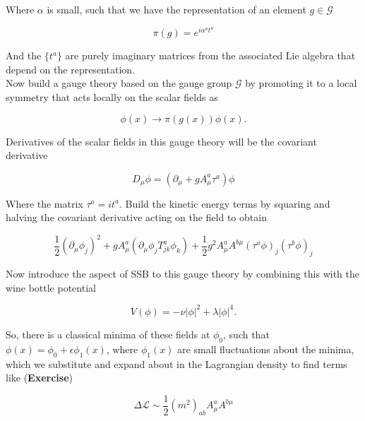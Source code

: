  \noindent Where $\alpha$ is small, such that we have the representation of an element $g \in \mathcal{G}$
 
 \begin{equation}
 \pi (g) = e^{i \alpha^a t^a}
 \end{equation}
 
 \noindent And the $\{t^a\}$ are purely imaginary matrices from the associated Lie algebra that depend on the representation. \\
 
 \noindent Now build a gauge theory based on the gauge group $\mathcal{G}$ by promoting it to a local symmetry that acts locally on the scalar fields as
 
 \begin{equation}
 \phi (x) \rightarrow \pi (g(x)) \phi (x).
 \end{equation}
 
 \noindent Derivatives of the scalar fields in this gauge theory will be the covariant derivative
 
 \begin{equation}
 D_\mu \phi = (\partial_\mu + g A_\mu^a \tau^a ) \phi
 \end{equation}
 
 \noindent Where the matrix $\tau^a = i t^a$. Build the kinetic energy terms by squaring and halving the covariant derivative acting on the field to obtain
 
 \begin{equation}
 \frac{1}{2} (\partial_\mu \phi_j )^2 + g A_\mu^a ( \partial_\mu \phi_j T_{jk}^a \phi_k ) + \frac{1}{2} g^2 A_\mu^a A^{b \mu} (\tau^a \phi)_j (\tau^b \phi)_j
 \end{equation}

\noindent Now introduce the aspect of SSB to this gauge theory by combining this with the wine bottle potential

\begin{equation}
V(\phi) = -\nu | \phi |^2 + \lambda | \phi |^4.
\end{equation}

\noindent So, there is a classical minima of these fields at $\phi_0$, such that $\phi (x) = \phi_0 + \epsilon \phi_1 (x)$, where $\phi_1 (x)$ are small fluctuations about the minima, which we substitute and expand about in the Lagrangian density to find terms like (\textbf{Exercise})

\begin{equation}
\Delta \mathcal{L} \sim \frac{1}{2} (m^2)_{ab} A_\mu^a A^{b \mu}
\end{equation}


